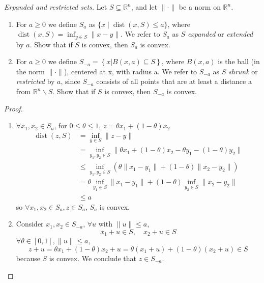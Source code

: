 \begin{problem}[2.14]
    \textit{Erpanded and restricted sets.} Let $S \subseteq \mathbb{R}^{n}$, and let $\|\cdot\|$ be a norm on $\mathbb{R}^n$.
    \begin{enumerate}
        \item For $a \ge 0$ we define $S_a$ as $\{x \mid \operatorname{dist}(x, S) \leq a\}$, where $\operatorname{dist}(x, S) = \inf_{y\in S}\|x - y\|$. We refer to $S_a$ as $S$ \textit{expanded} or \textit{extended} by $a$. Show that if $S$ is convex, then $S_a$ is convex.
        \item For $a \ge 0$ we define $S_{-a} = \left\{x | B(x, a) \subseteq S\right\}$, where $B(x, a)$ is the ball (in the norm $\|\cdot\|$), centered at x, with radius a. We refer to $S_{-a}$ as $S$ \textit{shrunk} or \textit{restricted} by $a$, since $S_{-a}$ consists of all points that are at least a distance a from $\mathbb{R}^n\backslash S$. Show that if $S$ is convex, then $S_{-a}$ is convex.
    \end{enumerate}

    \begin{proof}
        \begin{enumerate}
            \item $\forall x_1, x_2 \in S_a$, for $0 \le \theta \le 1$, $z = \theta x_1 + (1 - \theta)x_2$
            \begin{align*}
                \operatorname{dist}(z, S) &= \inf_{y\in S}\|z - y\|\\
                &= \inf_{y_1, y_2\in S}\|\theta x_1 + (1 - \theta)x_2 - \theta y_1 - (1 - \theta)y_2\|\\
                &\le \inf_{y_1, y_2\in S} (\theta\|x_1 - y_1\| + (1 - \theta)\|x_2 - y_2\|)\\
                &=\theta \inf_{y_1 \in S}\|x_1 - y_1\| + (1 - \theta) \inf_{y_2 \in S} \|x_2 - y_2\|\\
                &\le a
            \end{align*}
            so $\forall x_1, x_2 \in S_a, z \in S_a$, $S_{a}$ is convex.
            \item Consider $x_1, x_2 \in S_{-a}$, $\forall u$ with $\|u\| \le a$,\[x_1 + u \in S,\quad x_2 + u \in S\] $\forall \theta \in [0, 1], \|u\| \le a$,
            \[z + u = \theta x_1 + (1 - \theta)x_2 + u = \theta(x_1 + u) + (1 - \theta)(x_2 + u) \in S\]
            because $S$ is convex. We conclude that $z \in S_{-a}$.
        \end{enumerate}
    \end{proof}
\end{problem}

